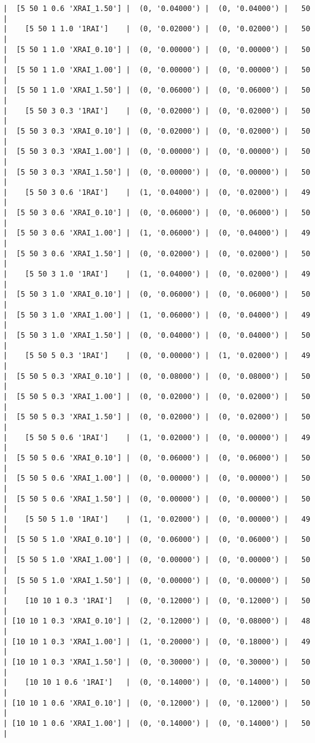 \documentclass{article}
\begin{document}
\begin{verbatim}
|  [5 50 1 0.6 'XRAI_1.50'] |  (0, '0.04000') |  (0, '0.04000') |   50  |
|    [5 50 1 1.0 '1RAI']    |  (0, '0.02000') |  (0, '0.02000') |   50  |
|  [5 50 1 1.0 'XRAI_0.10'] |  (0, '0.00000') |  (0, '0.00000') |   50  |
|  [5 50 1 1.0 'XRAI_1.00'] |  (0, '0.00000') |  (0, '0.00000') |   50  |
|  [5 50 1 1.0 'XRAI_1.50'] |  (0, '0.06000') |  (0, '0.06000') |   50  |
|    [5 50 3 0.3 '1RAI']    |  (0, '0.02000') |  (0, '0.02000') |   50  |
|  [5 50 3 0.3 'XRAI_0.10'] |  (0, '0.02000') |  (0, '0.02000') |   50  |
|  [5 50 3 0.3 'XRAI_1.00'] |  (0, '0.00000') |  (0, '0.00000') |   50  |
|  [5 50 3 0.3 'XRAI_1.50'] |  (0, '0.00000') |  (0, '0.00000') |   50  |
|    [5 50 3 0.6 '1RAI']    |  (1, '0.04000') |  (0, '0.02000') |   49  |
|  [5 50 3 0.6 'XRAI_0.10'] |  (0, '0.06000') |  (0, '0.06000') |   50  |
|  [5 50 3 0.6 'XRAI_1.00'] |  (1, '0.06000') |  (0, '0.04000') |   49  |
|  [5 50 3 0.6 'XRAI_1.50'] |  (0, '0.02000') |  (0, '0.02000') |   50  |
|    [5 50 3 1.0 '1RAI']    |  (1, '0.04000') |  (0, '0.02000') |   49  |
|  [5 50 3 1.0 'XRAI_0.10'] |  (0, '0.06000') |  (0, '0.06000') |   50  |
|  [5 50 3 1.0 'XRAI_1.00'] |  (1, '0.06000') |  (0, '0.04000') |   49  |
|  [5 50 3 1.0 'XRAI_1.50'] |  (0, '0.04000') |  (0, '0.04000') |   50  |
|    [5 50 5 0.3 '1RAI']    |  (0, '0.00000') |  (1, '0.02000') |   49  |
|  [5 50 5 0.3 'XRAI_0.10'] |  (0, '0.08000') |  (0, '0.08000') |   50  |
|  [5 50 5 0.3 'XRAI_1.00'] |  (0, '0.02000') |  (0, '0.02000') |   50  |
|  [5 50 5 0.3 'XRAI_1.50'] |  (0, '0.02000') |  (0, '0.02000') |   50  |
|    [5 50 5 0.6 '1RAI']    |  (1, '0.02000') |  (0, '0.00000') |   49  |
|  [5 50 5 0.6 'XRAI_0.10'] |  (0, '0.06000') |  (0, '0.06000') |   50  |
|  [5 50 5 0.6 'XRAI_1.00'] |  (0, '0.00000') |  (0, '0.00000') |   50  |
|  [5 50 5 0.6 'XRAI_1.50'] |  (0, '0.00000') |  (0, '0.00000') |   50  |
|    [5 50 5 1.0 '1RAI']    |  (1, '0.02000') |  (0, '0.00000') |   49  |
|  [5 50 5 1.0 'XRAI_0.10'] |  (0, '0.06000') |  (0, '0.06000') |   50  |
|  [5 50 5 1.0 'XRAI_1.00'] |  (0, '0.00000') |  (0, '0.00000') |   50  |
|  [5 50 5 1.0 'XRAI_1.50'] |  (0, '0.00000') |  (0, '0.00000') |   50  |
|    [10 10 1 0.3 '1RAI']   |  (0, '0.12000') |  (0, '0.12000') |   50  |
| [10 10 1 0.3 'XRAI_0.10'] |  (2, '0.12000') |  (0, '0.08000') |   48  |
| [10 10 1 0.3 'XRAI_1.00'] |  (1, '0.20000') |  (0, '0.18000') |   49  |
| [10 10 1 0.3 'XRAI_1.50'] |  (0, '0.30000') |  (0, '0.30000') |   50  |
|    [10 10 1 0.6 '1RAI']   |  (0, '0.14000') |  (0, '0.14000') |   50  |
| [10 10 1 0.6 'XRAI_0.10'] |  (0, '0.12000') |  (0, '0.12000') |   50  |
| [10 10 1 0.6 'XRAI_1.00'] |  (0, '0.14000') |  (0, '0.14000') |   50  |

\end{verbatim}
\end{document}

